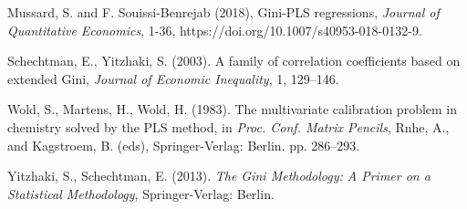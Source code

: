 \documentclass[a4paper, 12pt]{article}
\numberwithin{equation}{section}
\begin{document}
\begin{thebibliography}{18}

 Mussard, S. and F. Souissi-Benrejab (2018), Gini-PLS regressions, \emph{Journal of Quantitative Economics}, 1-36, https://doi.org/10.1007/s40953-018-0132-9.

 Schechtman, E., Yitzhaki, S. (2003). A family of correlation coefficients based on extended Gini, \emph{Journal of Economic Inequality}, 1, 129--146. 

 Wold, S., Martens, H., Wold, H. (1983). The multivariate calibration problem in chemistry solved by the PLS method, in \textit{Proc. Conf. Matrix Pencils}, Rnhe, A., and Kagstroem, B. (eds), Springer-Verlag: Berlin.  pp. 286--293.

 Yitzhaki, S., Schechtman, E. (2013). \emph{The Gini Methodology: A Primer on a Statistical Methodology}, Springer-Verlag: Berlin.

\end{thebibliography} 
\end{document}
